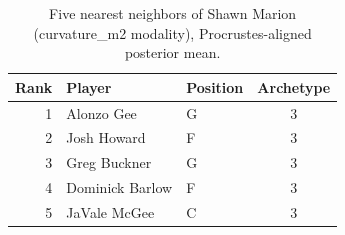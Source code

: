 \begin{table}[htbp]
  \centering\small
  \begin{tabular}{rllc}
    \toprule
    Rank & Player & Position & Archetype \\
    \midrule
    1 & Alonzo Gee & G & 3 \\
    2 & Josh Howard & F & 3 \\
    3 & Greg Buckner & G & 3 \\
    4 & Dominick Barlow & F & 3 \\
    5 & JaVale McGee & C & 3 \\
    \bottomrule
  \end{tabular}
  \caption{Five nearest neighbors of Shawn Marion (curvature_m2 modality), Procrustes-aligned posterior mean.}
  \label{tab:Shawn_Marion_neighbors_curvature_m2}
\end{table}

